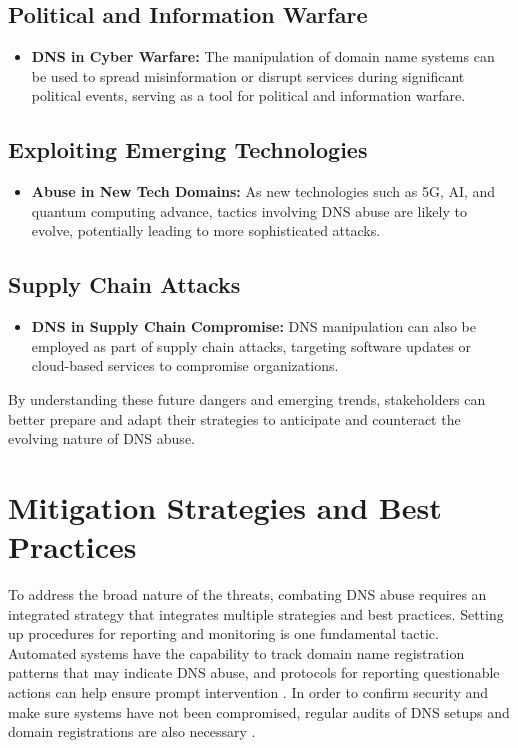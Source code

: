 \subsection{Political and Information Warfare}
\begin{itemize}
    \item \textbf{DNS in Cyber Warfare:} The manipulation of domain name systems can be used to spread misinformation or disrupt services during significant political events, serving as a tool for political and information warfare.\cite{chapple2021cyberwarfare}
\end{itemize}

\subsection{Exploiting Emerging Technologies}
\begin{itemize}
    \item \textbf{Abuse in New Tech Domains:} As new technologies such as 5G, AI, and quantum computing advance, tactics involving DNS abuse are likely to evolve, potentially leading to more sophisticated attacks.\cite{brunner2021cybersecurity}
\end{itemize}

\subsection{Supply Chain Attacks}
\begin{itemize}
    \item \textbf{DNS in Supply Chain Compromise:} DNS manipulation can also be employed as part of supply chain attacks, targeting software updates or cloud-based services to compromise organizations.\cite{boyson2014cyber}
\end{itemize}

By understanding these future dangers and emerging trends, stakeholders can better prepare and adapt their strategies to anticipate and counteract the evolving nature of DNS abuse.


\section{Mitigation Strategies and Best Practices }

To address the broad nature of the threats, combating DNS abuse requires an integrated strategy that integrates multiple strategies and best practices. Setting up procedures for reporting and monitoring is one fundamental tactic. Automated systems have the capability to track domain name registration patterns that may indicate DNS abuse, and protocols for reporting questionable actions can help ensure prompt intervention \cite{icannndnssec} . In order to confirm security and make sure systems have not been compromised, regular audits of DNS setups and domain registrations are also necessary \cite{lucas2021tls} .

